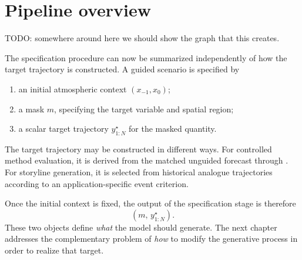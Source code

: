 



\section{Pipeline overview}


TODO: somewhere around here we should show the graph that this creates. 


The specification procedure can now be summarized independently of how the
target trajectory is constructed.
A guided scenario is specified by

\begin{enumerate}[noitemsep]
    \item an initial atmospheric context \((x_{-1},x_0)\);
    \item a mask \(m\), specifying the target variable and spatial region;
    \item a scalar target trajectory \(y^\star_{1:N}\) for the masked quantity.
\end{enumerate}

The target trajectory may be constructed in different ways.
For controlled method evaluation, it is derived from the matched unguided
forecast through .
For storyline generation, it is selected from historical analogue trajectories
according to an application-specific event criterion.

Once the initial context is fixed, the output of the specification stage is
therefore
\[
    \left(
        m,\,
        y^\star_{1:N}
    \right).
\]
These two objects define \emph{what} the model should generate.
The next chapter addresses the complementary problem of \emph{how} to modify
the generative process in order to realize that target.
